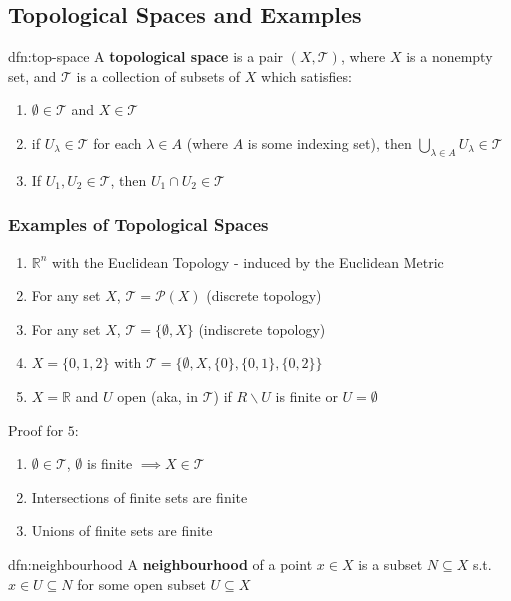 \documentclass{article}
\begin{document}
\subsection{Topological Spaces and Examples}
\begin{dfn}{dfn:top-space}{}
    A \textbf{topological space} is a pair $(X, \mathcal{T})$, where $X$ is a nonempty set, and $\mathcal{T}$ is a collection of subsets of $X$ which satisfies:
    \begin{enumerate}
        \item $\emptyset\in \mathcal{T}$ and $X\in \mathcal{T}$
        \item if $U_{\lambda}\in \mathcal{T}$ for each $\lambda\in A$ (where $A$ is some indexing set), then $\bigcup\limits_{\lambda \in A} U_{\lambda}\in \mathcal{T}$
        \item If $U_{1}, U_{2}\in \mathcal{T}$, then $U_{1} \cap U_{2}\in \mathcal{T}$
    \end{enumerate}
\end{dfn}

\subsubsection{Examples of Topological Spaces}
\begin{enumerate}
    \item $\mathbb{R}^{n}$ with the Euclidean Topology - induced by the Euclidean Metric
    \item For any set $X$, $\mathcal{T} = \mathcal{P}(X)$ (discrete topology)
    \item For any set $X$, $\mathcal{T} = \{\emptyset, X\}$ (indiscrete topology)
    \item $X = \{0,1,2\}$ with $\mathcal{T} = \{\emptyset, X, \{0\}, \{0,1\}, \{0,2\}\}$
    \item $X = \mathbb{R}$ and $U$ open (aka, in $\mathcal{T}$) if $R \backslash U$ is finite or $U = \emptyset$
\end{enumerate}
Proof for $5$:
\begin{enumerate}
    \item $\emptyset\in \mathcal{T}$, $\emptyset$ is finite $\implies X \in \mathcal{T}$
    \item Intersections of finite sets are finite
    \item Unions of finite sets are finite
\end{enumerate}

\begin{dfn}{dfn:neighbourhood}{}
    A \textbf{neighbourhood} of a point $x\in X$ is a subset $N \subseteq X$ s.t. $x\in U \subseteq N$ for some open subset $U \subseteq X$
\end{dfn}
\end{document}
